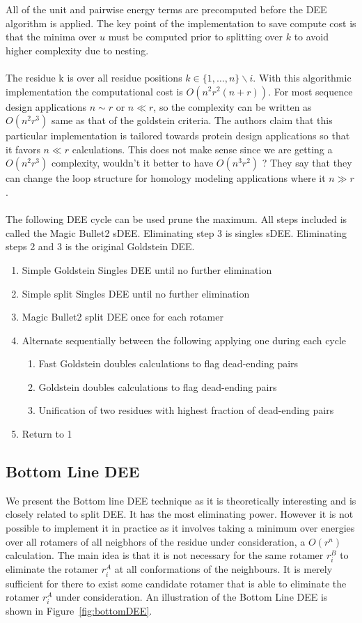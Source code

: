 \documentclass{article}
\begin{document}
\pagebreak

All of the unit and pairwise energy terms are precomputed before the DEE algorithm is applied. The key point of the implementation to save compute cost is that the minima over $u$ must be computed prior to splitting over $k$ to avoid higher complexity due to nesting. 
\\
\\
The residue k is over all residue positions $k \in \{1,\dots, n\}\backslash i$. With this algorithmic implementation the computational cost is $O(n^2r^2(n+r))$. For most sequence design applications $n \sim r$ or $n\ll r$, so the complexity can be written as $O(n^2r^3)$ same as that of the goldstein criteria. The authors claim that this particular implementation is tailored towards protein design applications so that it favors $n \ll r$ calculations. This does not make sense since we are getting a $O(n^2r^3)$ complexity, wouldn't it better to have $O(n^3r^2)$ ? They say that they can change the loop structure for homology modeling applications where it $n \gg r$. 
\\
\\
The following DEE cycle can be used prune the maximum. All steps included is called the Magic Bullet2 sDEE. Eliminating step 3 is singles sDEE. Eliminating steps 2 and 3 is the original Goldstein DEE. 
\begin{enumerate}
\item Simple Goldstein Singles DEE until no further elimination
\item Simple split Singles DEE until no further elimination
\item Magic Bullet2 split DEE once for each rotamer
\item Alternate sequentially between the following applying one during each cycle
\begin{enumerate}
\item  Fast Goldstein doubles calculations to flag dead-ending pairs
\item Goldstein doubles calculations to flag dead-ending pairs
\item Unification of two residues with highest fraction of dead-ending pairs
\end{enumerate}
\item Return to 1
\end{enumerate}


\subsection{Bottom Line DEE}
We present the Bottom line DEE technique as it is theoretically interesting and is closely related to split DEE. It has the most eliminating power. However it is not possible to implement it in practice as it involves taking a minimum over energies over all rotamers of all neigbhors of the residue under consideration, a $O(r^n)$ calculation.  The main idea is that it is not necessary for the same rotamer $r_i^B$ to eliminate the rotamer $r_i^A$ at all conformations of the neighbours. It is merely sufficient for there to exist some candidate rotamer that is able to eliminate the rotamer $r_i^A$ under consideration. An illustration of the Bottom Line DEE is shown in Figure~\ref{fig:bottomDEE}.
\end{document}
